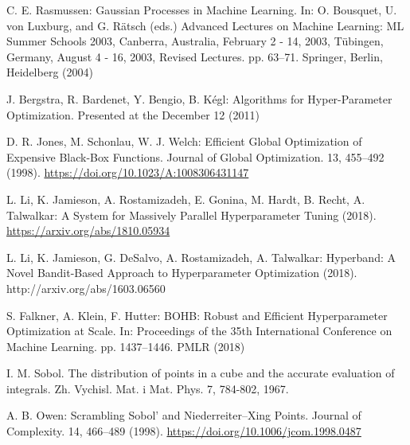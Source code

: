\documentclass[reprint,
superscriptaddress,
amsmath,amssymb,aps,showkeys,showpacs,
twoside,final,secnumarabic,%
nofootinbib]{revtex4-2}
\begin{document}
\begin{thebibliography}{}
C. E. Rasmussen: Gaussian Processes in Machine Learning. In: O. Bousquet, U. von Luxburg, and G. Rätsch (eds.) Advanced Lectures on Machine Learning: ML Summer Schools 2003, Canberra, Australia, February 2 - 14, 2003, Tübingen, Germany, August 4 - 16, 2003, Revised Lectures. pp. 63–71. Springer, Berlin, Heidelberg (2004)

J. Bergstra, R. Bardenet, Y. Bengio, B. Kégl: Algorithms for Hyper-Parameter Optimization. Presented at the December 12 (2011)

D. R. Jones, M. Schonlau, W. J. Welch: Efficient Global Optimization of Expensive Black-Box Functions. Journal of Global Optimization. 13, 455–492 (1998). \url{https://doi.org/10.1023/A:1008306431147}

L. Li, K. Jamieson, A. Rostamizadeh, E. Gonina, M. Hardt, B. Recht, A. Talwalkar: A System for Massively Parallel Hyperparameter Tuning (2018). \url{https://arxiv.org/abs/1810.05934}

L. Li, K. Jamieson, G. DeSalvo, A. Rostamizadeh, A. Talwalkar: Hyperband: A Novel Bandit-Based Approach to Hyperparameter Optimization (2018). http://arxiv.org/abs/1603.06560

S. Falkner, A. Klein, F. Hutter: BOHB: Robust and Efficient Hyperparameter Optimization at Scale. In: Proceedings of the 35th International Conference on Machine Learning. pp. 1437–1446. PMLR (2018)

I. M. Sobol. The distribution of points in a cube and the accurate evaluation of integrals. Zh. Vychisl. Mat. i Mat. Phys. 7, 784-802, 1967.

A. B. Owen: Scrambling Sobol’ and Niederreiter–Xing Points. Journal of Complexity. 14, 466–489 (1998). \url{https://doi.org/10.1006/jcom.1998.0487}

\end{thebibliography}
\end{document}
